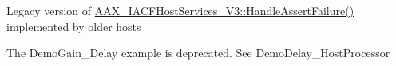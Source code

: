 \begin{DoxyRefList}
\item[Member \mbox{\hyperlink{a02112_a49111de18abd12b671ae16138e244af3}{AAX\+\_\+\+IACFHost\+Services\+::Assert}} (const char $\ast$i\+File, int32\+\_\+t i\+Line, const char $\ast$i\+Note)=0]\label{a00881__deprecated000015}%
%
Legacy version of \mbox{\hyperlink{a02120_aaaddbd89dd3d6dd2e9e9def5b99c579f}{AAX\+\_\+\+IACFHost\+Services\+\_\+\+V3\+::\+Handle\+Assert\+Failure()}} implemented by older hosts 
\item[Module \mbox{\hyperlink{a00946}{Example\+Plug\+Ins}} ]\label{a00881__deprecated000001}%
%
The Demo\+Gain\+\_\+\+Delay example is deprecated. See Demo\+Delay\+\_\+\+Host\+Processor
\end{DoxyRefList}